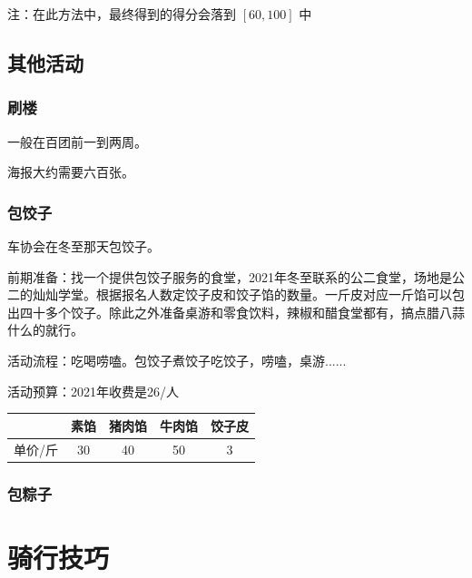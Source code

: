 \documentclass{ctexbook}
\begin{document}
注：在此方法中，最终得到的得分会落到 $[60,100]$ 中

\section{其他活动}
\subsection{刷楼}
一般在百团前一到两周。

海报大约需要六百张。

\subsection{包饺子}
车协会在冬至那天包饺子。

前期准备：找一个提供包饺子服务的食堂，2021年冬至联系的公二食堂，场地是公二的灿灿学堂。根据报名人数定饺子皮和饺子馅的数量。一斤皮对应一斤馅可以包出四十多个饺子。除此之外准备桌游和零食饮料，辣椒和醋食堂都有，搞点腊八蒜什么的就行。

活动流程：吃喝唠嗑。包饺子煮饺子吃饺子，唠嗑，桌游......

活动预算：2021年收费是26/人
\begin{table}[H]
    \centering
    \begin{tabular}{|c|c|c|c|c|}
    \hline
    ~  & 素馅 & 猪肉馅 & 牛肉馅 & 饺子皮 \\ \hline
    单价/斤 & 30 & 40  & 50  & 3   \\ \hline
    \end{tabular}
\end{table}

\subsection{包粽子}

\chapter{骑行技巧}
\end{document}
